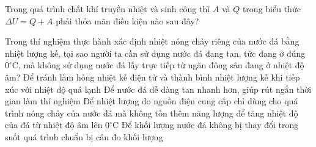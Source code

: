 \begin{ex}
Trong quá trình chất khí truyền nhiệt và sinh công thì $A$ và $Q$ trong biểu thức $\Delta U=Q+A$ phải thỏa mãn điều kiện nào sau đây?
\end{ex}

\begin{ex}
Trong thí nghiệm thực hành xác định nhiệt nóng chảy riêng của nước đá bằng nhiệt lượng kế, tại sao người ta cần sử dụng nước đá đang tan, tức đang ở đúng $0^{\circ}\mathrm{C}$, mà không sử dụng nước đá lấy trực tiếp từ ngăn đông sâu đang ở nhiệt độ âm?
\choice
{Để tránh làm hỏng nhiệt kế điện tử và thành bình nhiệt lượng kế khi tiếp xúc với nhiệt độ quá lạnh}
{Để nước đá dễ dàng tan nhanh hơn, giúp rút ngắn thời gian làm thí nghiệm}
{\True Để nhiệt lượng do nguồn điện cung cấp chỉ dùng cho quá trình nóng chảy của nước đá mà không tốn thêm năng lượng để tăng nhiệt độ của đá từ nhiệt độ âm lên $0^{\circ}\mathrm{C}$}
{Để khối lượng nước đá không bị thay đổi trong suốt quá trình chuẩn bị cân đo khối lượng}
\end{ex}

